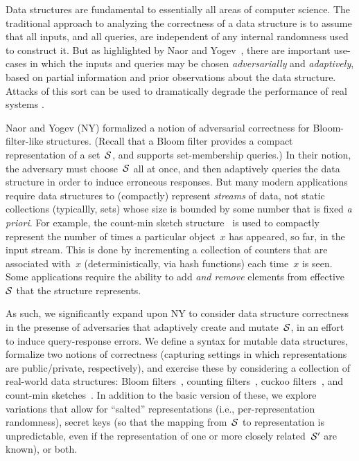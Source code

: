 %
Data structures are fundamental to essentially all areas of computer science.  
The traditional approach to analyzing the correctness of a data structure 
is to assume that all inputs, and all queries, 
are independent of any internal randomness used to construct it. 
But as highlighted by Naor and
Yogev~\cite{naor2015bloom}, there are important use-cases in which the inputs and queries
may be chosen \emph{adversarially} and \emph{adaptively}, based on partial
information and prior observations about the data structure. Attacks of this
sort can be used to dramatically degrade the performance of real systems
\cite{crosby2003denial,gerbet2015power,lipton1993clocked}.

Naor and Yogev (NY) formalized a notion of adversarial correctness for
Bloom-filter-like structures. (Recall that
a Bloom filter provides a compact representation of a set~$\mathcal{S}$, and supports
set-membership queries.)
In their notion, the adversary must choose~$\mathcal{S}$ all at once,
and then adaptively queries the data structure in order to induce
erroneous responses. 
%
But many modern applications require data structures to (compactly) represent \emph{streams} of
data, not static collections (typicallly, sets) whose size is bounded by some number that is
fixed \emph{a priori}.  
%
For example, the count-min
sketch structure~\cite{xxx} is used to compactly represent the number
of times a particular object~$x$ has appeared, so far, in the input
stream.  This is done by incrementing a collection of counters that
are associated with~$x$ (deterministically, via hash functions) each
time~$x$ is seen.  Some applications require the ability to
add \emph{and remove} elements from effective~$\mathcal{S}$ that the structure
represents.  

As such, we significantly expand upon NY to consider data structure
correctness in the presense of adversaries that adaptively create and
mutate~$\mathcal{S}$, in an effort to induce query-response errors.  We
define a syntax for mutable data structures, formalize two notions of
correctness (capturing settings in which representations
are public/private, respectively), and exercise these by
considering a collection of real-world data structures: Bloom
filters~\cite{xxx}, counting filters~\cite{xxx}, cuckoo
filters~\cite{xxx}, and count-min sketches~\cite{xxx}.   In addition to the basic version of these, we
explore variations that allow for ``salted'' representations (i.e.,
per-representation randomness), secret keys (so that the mapping
from~$\mathcal{S}$ to representation is unpredictable, even if the
representation of one or more closely related~$\mathcal{S}'$ are known), or both.

